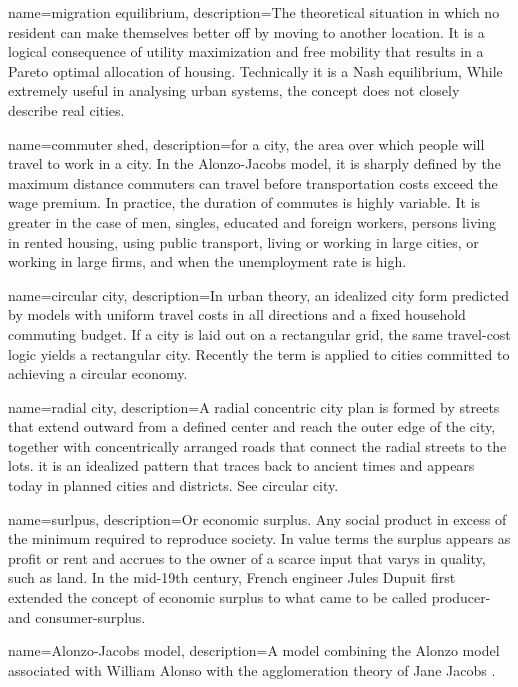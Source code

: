 {
name=migration equilibrium,
description={The theoretical situation in which no resident can  make themselves better off by moving to another location. It is a logical consequence of utility maximization and free mobility that results in a Pareto optimal allocation of housing. Technically it is a Nash equilibrium, While extremely useful in analysing urban systems, the concept does not closely describe real cities.  }
}

{
name=commuter shed,
description={for a city, the area over which people will travel to work in a city. In the Alonzo-Jacobs model, it is sharply defined by the maximum distance commuters can travel before transportation costs exceed the wage premium. In  practice, the duration of commutes is highly variable. It is greater in the case of men, singles, educated and foreign workers, persons living in rented housing, using public transport, living or working in large cities, or working in large firms,  and when the  unemployment rate is high.\cite{axisaFactorsInfluencingCommute2012} }
}

{
name=circular city,
description={In urban theory, an idealized city form predicted by models with uniform travel costs in all directions and a fixed household commuting budget. If a city is laid out on a rectangular grid, the same travel-cost logic yields a rectangular city. Recently the term is applied to cities committed to achieving a circular economy. }
}

{
name=radial city,
description={A radial concentric city plan is formed by streets that extend outward from a defined center and reach the outer edge of the city, together with concentrically arranged roads that connect the radial streets to the lots. it is an idealized pattern that traces back to ancient times and appears  today in planned cities and districts. See \gls{circular city}.}
}

{
name=surlpus,
description={Or economic surplus. Any social product in excess of the minimum required to reproduce society. In value terms the surplus appears as profit or rent and accrues to the owner of a  scarce input that varys in quality, such as land. In the mid-19th century, French engineer Jules Dupuit first extended the concept of economic surplus to what came to be called producer- and consumer-surplus.}
}

{
name=Alonzo-Jacobs model,
description={A model combining the Alonzo model  associated with  William Alonso \cite{alonsoModelUrbanLand1960} with the \gls{agglomeration} theory of Jane Jacobs \cite{jacobsEconomyCities1969a}. }
}

